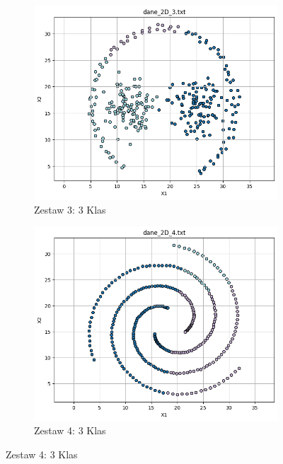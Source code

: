 \documentclass[polish,12pt,a4paper]{extarticle}
\begin{document}
\begin{figure}[h!]
\begin{subfigure}[b]{0.30\textwidth}
    \end{subfigure}
    \hfill
    \begin{subfigure}[b]{0.30\textwidth}
        \includegraphics[width=\linewidth]{img/hierarchical/centroid/data3.png}
        \captionsetup{labelformat=empty}
        \caption{Zestaw 3: 3 Klas}
    \end{subfigure}
    \hfill
    \begin{subfigure}[b]{0.30\textwidth}
        \includegraphics[width=\linewidth]{img/hierarchical/centroid/data4.png}
        \captionsetup{labelformat=empty}
        \caption{Zestaw 4: 3 Klas}
    \end{subfigure}

\end{figure}
\end{document}
